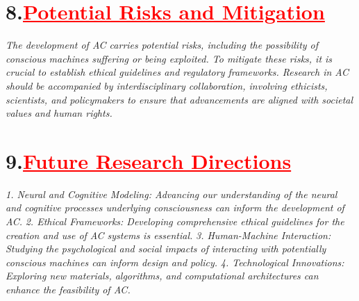 \documentclass[12pt]{article}
\begin{document}
\section*{\textbf{8.\hspace{1cm}\textcolor{red}{\underline{\large{Potential Risks and Mitigation}}}}}
\hspace{1cm}\large{\emph{The development of AC carries potential risks, including the possibility of conscious machines suffering or being exploited. To mitigate these risks, it is crucial to establish ethical guidelines and regulatory frameworks. Research in AC should be accompanied by interdisciplinary collaboration, involving ethicists, scientists, and policymakers to ensure that advancements are aligned with societal values and human rights.}}\vspace{1cm}\newline
\section*{\textbf{9.\hspace{1cm}\textcolor{red}{\underline{\large{Future Research Directions}}}}}
\hspace{1cm}\large{\emph{1. Neural and Cognitive Modeling: Advancing our understanding of the neural and cognitive processes underlying consciousness can inform the development of AC.}}\vspace{1cm}\newline
\hspace{1cm}\large{\emph{2. Ethical Frameworks: Developing comprehensive ethical guidelines for the creation and use of AC systems is essential.}}\vspace{1cm}\newline
\hspace{1cm}\large{\emph{3. Human-Machine Interaction: Studying the psychological and social impacts of interacting with potentially conscious machines can inform design and policy.}}\vspace{1cm}\newline
\hspace{1cm}\large{\emph{4. Technological Innovations: Exploring new materials, algorithms, and computational architectures can enhance the feasibility of AC.}}\vspace{1cm}\newline
\end{document}
